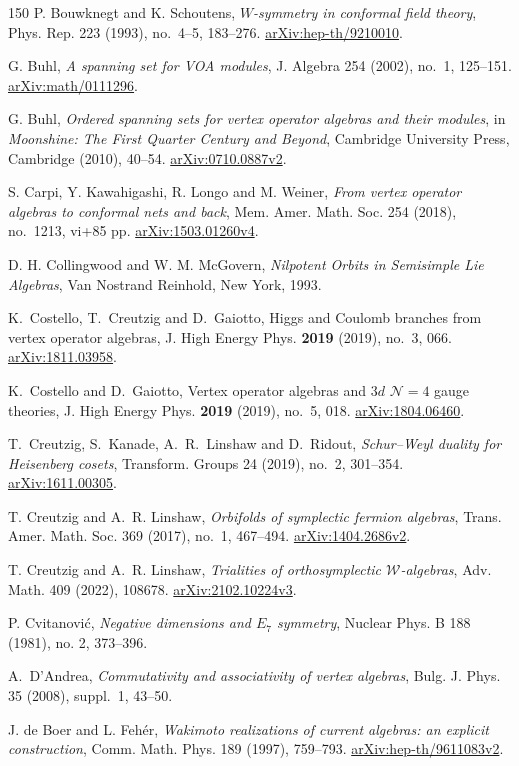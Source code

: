 \documentclass[11pt,a4paper]{amsart}
\numberwithin{equation}{section}
\theoremstyle{definition}
\theoremstyle{remark}
\newcommand{\arxiv}[1]{\href{https://arxiv.org/abs/#1}{arXiv:#1}}
\begin{document}
\begin{thebibliography}{150}
 P. Bouwknegt and K. Schoutens,
\emph{$W$-symmetry in conformal field theory},
Phys. Rep. 223 (1993), no.~4--5, 183--276. \arxiv{hep-th/9210010}.

 G. Buhl,
\emph{A spanning set for VOA modules},
J. Algebra 254 (2002), no.~1, 125--151. \arxiv{math/0111296}.

 G. Buhl,
\emph{Ordered spanning sets for vertex operator algebras and their modules},
in \emph{Moonshine: The First Quarter Century and Beyond}, Cambridge University Press, Cambridge (2010), 40--54. \arxiv{0710.0887v2}.

 S. Carpi, Y. Kawahigashi, R. Longo and M. Weiner,
\emph{From vertex operator algebras to conformal nets and back},
Mem. Amer. Math. Soc. 254 (2018), no.~1213, vi+85 pp. \arxiv{1503.01260v4}.


 D. H. Collingwood and W. M. McGovern,
\emph{Nilpotent Orbits in Semisimple Lie Algebras},
Van Nostrand Reinhold, New York, 1993.

K.~Costello, T.~Creutzig and D.~Gaiotto,
Higgs and Coulomb branches from vertex operator algebras,
J. High Energy Phys. \textbf{2019} (2019), no.~3, 066.
\arxiv{1811.03958}.

K.~Costello and D.~Gaiotto,
Vertex operator algebras and $3d$ $\mathcal N=4$ gauge theories,
J. High Energy Phys. \textbf{2019} (2019), no.~5, 018.
\arxiv{1804.06460}.

 T.~Creutzig, S.~Kanade, A.~R.~Linshaw and D.~Ridout,
\emph{Schur--Weyl duality for Heisenberg cosets},
Transform. Groups 24 (2019), no.~2, 301--354. \arxiv{1611.00305}.

 T. Creutzig and A.~R. Linshaw,
\emph{Orbifolds of symplectic fermion algebras},
Trans. Amer. Math. Soc. 369 (2017), no.~1, 467--494. \arxiv{1404.2686v2}.

 T. Creutzig and A.~R. Linshaw,
\emph{Trialities of orthosymplectic $\mathcal W$-algebras},
Adv. Math. 409 (2022), 108678. \arxiv{2102.10224v3}.

 P. Cvitanovi\'c,
\emph{Negative dimensions and $E_7$ symmetry},
Nuclear Phys. B 188 (1981), no. 2, 373--396.

 A.~D'Andrea,
\emph{Commutativity and associativity of vertex algebras},
Bulg. J. Phys. 35 (2008), suppl.~1, 43--50.

 J. de Boer and L. Feh\'er,
\emph{Wakimoto realizations of current algebras: an explicit construction},
Comm. Math. Phys. 189 (1997), 759--793. \arxiv{hep-th/9611083v2}.


\end{thebibliography}
\end{document}
